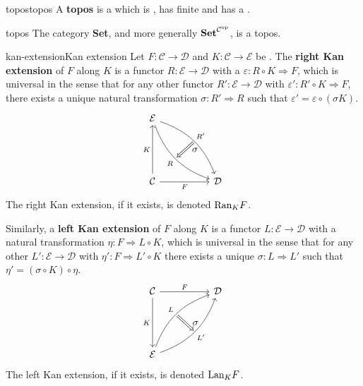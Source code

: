 \begin{topic}{topos}{topos}
    A \textbf{topos} is a  which is , has finite  and has a .
\end{topic}

\begin{example}{topos}
    The category \textbf{Set}, and more generally $\textbf{Set}^{\mathcal{C}^\textup{op}}$, is a topos.
\end{example}

\begin{topic}{kan-extension}{Kan extension}
    Let $F \colon \mathcal{C} \to \mathcal{D}$ and $K \colon \mathcal{C} \to \mathcal{E}$ be . The \textbf{right Kan extension} of $F$ along $K$ is a functor $R \colon \mathcal{E} \to \mathcal{D}$ with a  $\varepsilon \colon R \circ K \Rightarrow F$, which is universal in the sense that for any other functor $R' \colon \mathcal{E} \to \mathcal{D}$ with $\varepsilon' : R' \circ K \Rightarrow F$, there exists a unique natural transformation $\sigma : R' \Rightarrow R$ such that $\varepsilon' = \varepsilon \circ (\sigma K)$.
    \[ \svg \begin{tikzcd}[row sep=5em, column sep=5em] \mathcal{E} \arrow[swap, bend right=25]{dr}[name=R1]{R} \arrow[bend left=25]{dr}[name=R2]{R'} \\ \mathcal{C} \arrow[swap]{r}{F} \arrow{u}{K} & \mathcal{D} \arrow[shorten <=2pt,shorten >=2pt,Rightarrow,to path={(R2) -- node[label=right:$\sigma$] {} (R1)}]{}\end{tikzcd} \]
    The right Kan extension, if it exists, is denoted $\textup{Ran}_K F$.

    Similarly, a \textbf{left Kan extension} of $F$ along $K$ is a functor $L \colon \mathcal{E} \to \mathcal{D}$ with a natural transformation $\eta \colon F \Rightarrow L \circ K$, which is universal in the sense that for any other $L' \colon \mathcal{E} \to \mathcal{D}$ with $\eta' : F \Rightarrow L' \circ K$ there exists a unique $\sigma : L \Rightarrow L'$ such that $\eta' = (\sigma \circ K) \circ \eta$.
    \[ \svg \begin{tikzcd}[row sep=5em, column sep=5em] \mathcal{C} \arrow{r}{F} \arrow[swap]{d}{K} & \mathcal{D} \\ \mathcal{E} \arrow[bend left=25]{ur}[name=L1]{L} \arrow[swap, bend right=25]{ur}[name=L2]{L'} \arrow[shorten <=2pt,shorten >=2pt,Rightarrow,to path={(L1) -- node[label=right:$\sigma$] {} (L2)}]{} \end{tikzcd} \]
    The left Kan extension, if it exists, is denoted $\textup{Lan}_K F$.
\end{topic}

